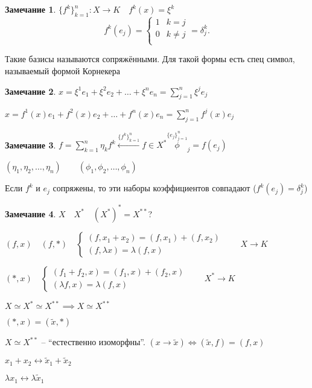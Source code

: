 \documentclass{book}
\newcommand{\tl}[1]{\widetilde{#1}}
\newcommand{\ov}[2]{\overset{#1}{#2}}
\theoremstyle{definition}
\newtheorem*{note}{Замечание}
\begin{document}
\begin{note}
    $\{f^k\}_{k=1}^n:X\to K\quad f^k(x) = \xi^k$ \[
        f^k\left( e_j \right)  = \begin{cases}
            1&k=j\\
            0&k\neq j\\
        \end{cases} = \delta_j^k
    .\] 

    Такие базисы называются сопряжёнными. Для такой формы есть спец символ, называемый формой Корнекера
\end{note}

\begin{note}
    $x = \xi^1e_1 + \xi^2e_2 + \ldots + \xi^ne_n = \sum_{j=1}^{n} \xi^je_j$ 

    $x = f^1(x)e_1 + f^2(x)e_2 + \ldots + f^n(x)e_n = \sum_{j=1}^{n} f^j(x)e_j$
\end{note}

\begin{note}
    $f = \sum_{k=1}^{n} \eta_kf^k \ov{\{f^k\}_{k=1}^n}{\leftarrow}  f\in X^* \ov{\{e_j\}_{j=1}^n}\phi_j = f\left( e_j \right) $

    $(\eta_1, \eta_2, \ldots, \eta_n)\qquad \left( \phi_1, \phi_2, \ldots, \phi_n \right) $ 

    Если $f^k$ и  $e_j$ сопряжены, то эти наборы коэффициентов совпадают ($f^k(e_j) = \delta_j^k$)
\end{note}

\begin{note}
    $X\quad X^*\quad (X^*)^* = X^{* *}$?

    $(f,x)\quad (f,*)\quad \begin{cases}
        (f,x_1+x_2) = (f,x_1) + (f,x_2)\\
        (f,\lambda x) = \lambda (f,x)
    \end{cases}\qquad X\to K$ 

    $(*,x)\quad \begin{cases}
        (f_1+f_2,x) = (f_1,x) + (f_2,x)\\
        (\lambda f,x) = \lambda (f,x)
    \end{cases}\qquad X^*\to K$

    $X\simeq X^*\simeq X^{* *} \implies X\simeq X^{* *}$

    $(*,x) = \left( \tl x, * \right) $

    $X \simeq X^{* *}$ -- ``естественно изоморфны''.  $(x\rightarrow \tl x) \iff  (\tl x, f) = (f,x)$ 

    $x_1+x_2 \longleftrightarrow \tl x_1 + \tl x_2$

    $\lambda x_1 \longleftrightarrow \lambda \tl x_1$
\end{note}
\end{document}
